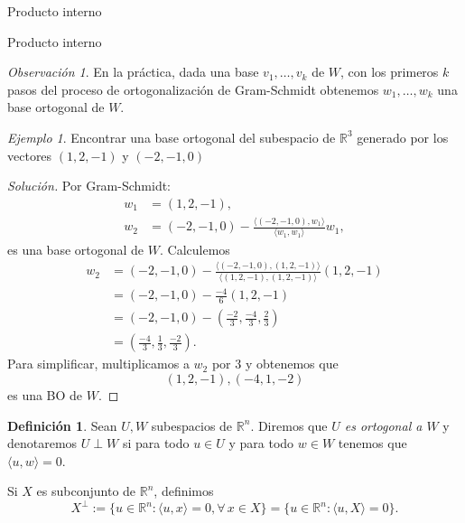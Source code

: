 \documentclass[a4paper,12pt,twoside,spanish,reqno]{amsbook}
\numberwithin{equation}{section}
\theoremstyle{definition}
\newtheorem{definicion}[teorema]{Definici\'on}
\theoremstyle{remark}
\newtheorem*{ejemplo*}{Ejemplo}
\newtheorem*{obs*}{Observaci\'on}
\newcommand{\la}{\langle}
\newcommand{\ra}{\rangle}
\newcommand{\R}{\mathbb R}
\begin{document}
\begin{chapter}{Producto interno}
\begin{section}{Producto interno}
\begin{obs*}
        En la práctica, dada una base $v_1,\ldots,v_k$ de $W$,  con los primeros $k$ pasos del proceso de ortogonalización de Gram-Schmidt obtenemos $ w_{1},\ldots,w_k $ una base ortogonal de $W$.
        \end{obs*}
        
        \begin{ejemplo*}
            Encontrar una base ortogonal del subespacio de $\R^3$ generado por los vectores $(1,2,-1)$ y $(-2,-1,0)$
            \begin{proof}[Solución] Por Gram-Schmidt:
                \begin{align*}
                w_1 &= (1,2,-1),  \\
                w_2 &= (-2,-1,0) - \frac{\la (-2,-1,0),w_1\ra}{\la w_1,w_1\ra}w_1,
                \end{align*}
                es una base ortogonal de $W$. Calculemos 
                \begin{align*}
                    w_2  &= (-2,-1,0) - \frac{\la (-2,-1,0),(1,2,-1)\ra}{\la(1,2,-1),(1,2,-1)\ra}(1,2,-1)\\
                    &= (-2,-1,0) - \frac{-4}{6}(1,2,-1) \\
                    &= (-2,-1,0) - (\frac{-2}{3},\frac{-4}{3},\frac{2}{3}) \\
                    &= (\frac{-4}{3},\frac{1}{3},\frac{-2}{3}).
                \end{align*}
                Para simplificar, multiplicamos a $w_2$ por $3$ y obtenemos que
                \begin{equation*}
                    (1,2,-1), (-4,1,-2)
                \end{equation*} 
                es una BO de $W$. 
                
            \end{proof}  
        \end{ejemplo*}
        
        \medskip
        
        \begin{definicion}  Sean $U, W$ subespacios de $\R^n$. Diremos que \textit{$U$ es ortogonal a $W$} y denotaremos $U \perp W$ si  para todo $u \in U$ y para todo $w \in W$ tenemos que $ \la u,w\ra =0$. 
            
            Si $X$ es subconjunto de $\R^n$,  definimos 
            $$
            X^\perp := \{u \in \R^n: \la u,x\ra = 0, \forall\, x \in X\} = \{u \in \R^n: \la u,X\ra = 0\}.
            $$ 
        \end{definicion}
        

\end{section}
\end{chapter}
\end{document}
